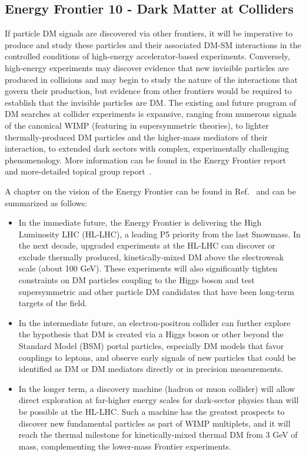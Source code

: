 \documentclass[nofootinbib]{article}
\begin{document}
\subsection{Energy Frontier 10 - Dark Matter at Colliders}

If particle DM signals are discovered via other frontiers, it will be imperative to produce and study these particles and their associated DM-SM interactions in the controlled conditions of high-energy accelerator-based experiments.
Conversely, high-energy experiments may discover evidence that new invisible particles are produced in collisions and may begin to study the nature of the interactions that govern their production, but evidence from other frontiers would be required to establish that the invisible particles are DM.
The existing and future program of DM searches at collider experiments is expansive, ranging from numerous signals of the canonical WIMP (featuring in supersymmetric theories), to lighter thermally-produced DM particles and the higher-mass mediators of their interaction, to extended dark sectors with complex, experimentally challenging phenomenology. 
More information can be found in the Energy Frontier report~\cite{Energy-Frontier-Report} and more-detailed topical group report~\cite{Bose:2022obr}.

\vspace{1em}

A chapter on the vision of the Energy Frontier can be found in Ref.~\cite{Energy-Frontier-Report} and can be summarized as follows: 

\begin{itemize}
\item In the immediate future, the Energy Frontier is delivering the High Luminosity LHC (HL-LHC), a leading P5 priority from the last Snowmass.
  In the next decade, upgraded experiments at the HL-LHC can discover or exclude thermally produced, kinetically-mixed DM above the electroweak scale (about 100 GeV). These experiments will also significantly tighten constraints on DM particles coupling to the Higgs boson and test supersymmetric and other particle DM candidates that have been long-term targets of the field. %
\item In the intermediate future, an electron-positron collider can further explore the hypothesis that DM is created via a Higgs boson or other beyond the Standard Model (BSM) portal particles, especially DM models that favor couplings to leptons, and observe early signals of new particles that could be identified as DM or DM mediators directly or in precision measurements. 
\item In the longer term, a discovery machine (hadron or muon collider) will allow direct exploration at far-higher energy scales for dark-sector physics than will be possible at the HL-LHC. Such a machine has the greatest prospects to discover new fundamental particles as part of WIMP multiplets, and it will reach the thermal milestone for kinetically-mixed thermal DM from 3 GeV of mass, complementing the lower-mass Frontier experiments.  %
\end{itemize}
\end{document}
